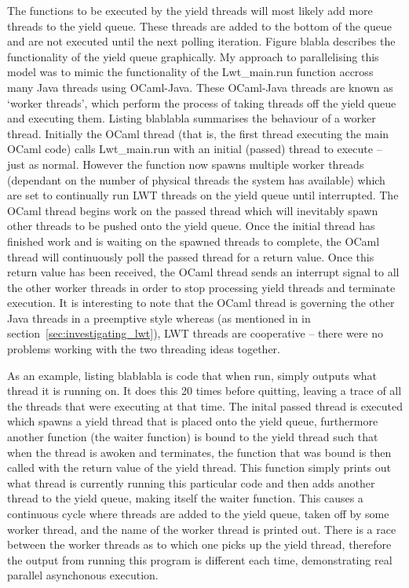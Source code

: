 \documentclass[12pt,twoside,notitlepage]{report}
\begin{document}
The functions to be executed by the yield threads will most likely add more threads to the yield queue. These threads are added to the bottom of the queue and are not executed until the next polling iteration. Figure blabla describes the functionality of the yield queue graphically.
%
%
My approach to parallelising this model was to mimic the functionality of the Lwt\_main.run function accross many Java threads using OCaml-Java. These OCaml-Java threads are known as `worker threads', which perform the process of taking
threads off the yield queue and executing them. Listing blablabla summarises the behaviour of a worker thread. Initially the OCaml thread (that is, the first thread executing the main OCaml
code) calls Lwt\_main.run with an initial (passed) thread to execute -- just as normal. However the function now spawns multiple worker threads (dependant on the number of physical threads the system has available) which are set to
continually run LWT threads on the yield queue until interrupted. The OCaml thread begins work on the passed thread which will inevitably spawn other threads to be pushed onto the yield queue. Once the initial thread has finished work
and is waiting on the spawned threads to complete, the OCaml thread will continuously poll the passed thread for a return value. Once this return value has been received, the OCaml thread sends an interrupt signal to all the other
worker threads in order to stop processing yield threads and terminate execution.  It is interesting to note that the OCaml thread is governing the other Java threads in a preemptive style whereas (as mentioned in in
section~\ref{sec:investigating_lwt}), LWT threads are cooperative -- there were no problems working with the two threading ideas together.

%
%
As an example, listing blablabla is code that when run, simply outputs what thread it is running on. It does this 20 times before quitting, leaving a trace of all the threads that
were executing at that time. The inital passed thread is executed which spawns a yield thread that is placed onto the yield queue, furthermore another function (the waiter function) is bound to the yield thread such that when the
thread is awoken and terminates, the function that was bound is then called with the return value of the yield thread. This function simply prints out what thread is currently running this particular code and then adds another thread
to the yield queue, making itself the waiter function. This causes a continuous cycle where threads are added to the yield queue, taken off by some worker thread, and the name of the worker thread is printed out. There is a race
between the worker threads as to which one picks up the yield thread, therefore the output from running this program is different each time, demonstrating real parallel asynchonous execution.
\end{document}
